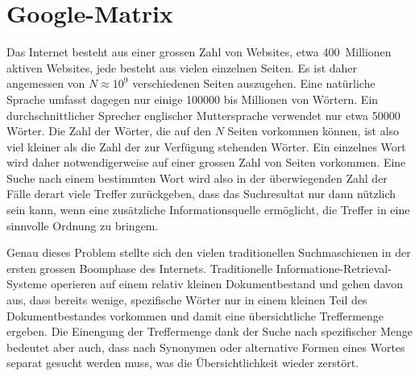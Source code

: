%
%
%
\section{Google-Matrix
\label{buch:section:google-matrix}}
Das Internet besteht aus einer grossen Zahl von Websites, etwa 400~Millionen
aktiven Websites, jede besteht aus vielen einzelnen Seiten.
Es ist daher angemessen von $N\approx 10^9$ verschiedenen Seiten auszugehen.
Eine natürliche Sprache umfasst dagegen nur einige 100000 bis Millionen
von Wörtern.
Ein durchschnittlicher Sprecher englischer Muttersprache verwendet nur etwa
50000 Wörter.
Die Zahl der Wörter, die auf den $N$ Seiten vorkommen können, ist also
viel kleiner als die Zahl der zur Verfügung stehenden Wörter.
Ein einzelnes Wort wird daher notwendigerweise auf einer grossen Zahl
von Seiten vorkommen.
Eine Suche nach einem bestimmten Wort wird also in der überwiegenden Zahl
der Fälle derart viele Treffer zurückgeben, dass das Suchresultat
nur dann nützlich sein kann, wenn eine zusätzliche Informationsquelle
ermöglicht, die Treffer in eine sinnvolle Ordnung zu bringem.

Genau dieses Problem stellte sich den vielen traditionellen Suchmaschienen
in der ersten grossen Boomphase des Internets.
Traditionelle Informatione-Retrieval-Systeme operieren auf einem relativ
kleinen Dokumentbestand und gehen davon aus, dass bereits wenige, spezifische
Wörter nur in einem kleinen Teil des Dokumentbestandes vorkommen und damit
eine übersichtliche Treffermenge ergeben.
Die Einengung der Treffermenge dank der Suche nach spezifischer Menge
bedeutet aber auch, dass nach Synonymen oder alternative Formen eines
Wortes separat gesucht werden muss, was die Übersichtlichkeit wieder
zerstört.

%
%
